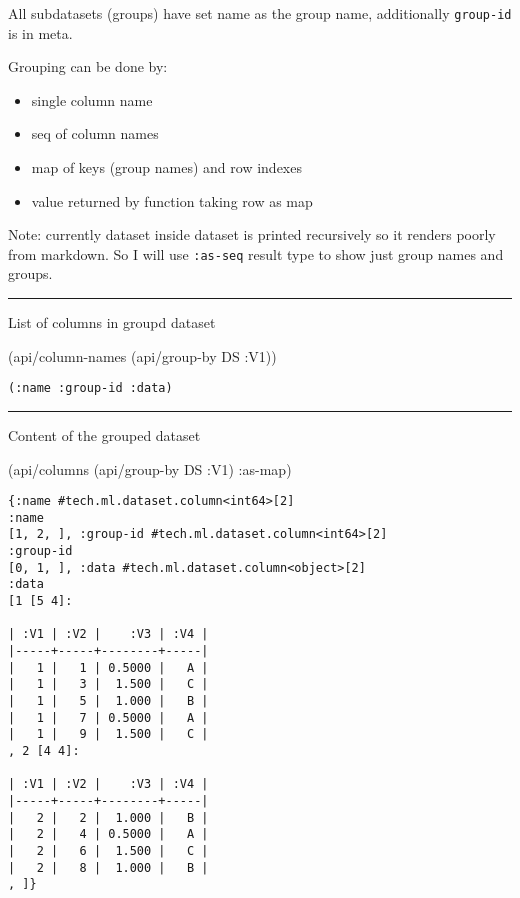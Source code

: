 \documentclass[]{article}
\newenvironment{Shaded}{\begin{snugshade}}{\end{snugshade}}
\newcommand{\AttributeTok}[1]{\textcolor[rgb]{0.77,0.63,0.00}{#1}}
\newcommand{\NormalTok}[1]{#1}
\providecommand{\tightlist}{%
  \setlength{\itemsep}{0pt}\setlength{\parskip}{0pt}}
\begin{document}
All subdatasets (groups) have set name as the group name, additionally
\texttt{group-id} is in meta.

Grouping can be done by:

\begin{itemize}
\tightlist
\item
  single column name
\item
  seq of column names
\item
  map of keys (group names) and row indexes
\item
  value returned by function taking row as map
\end{itemize}

Note: currently dataset inside dataset is printed recursively so it
renders poorly from markdown. So I will use \texttt{:as-seq} result type
to show just group names and groups.

\begin{center}\rule{0.5\linewidth}{0.5pt}\end{center}

List of columns in groupd dataset

\begin{Shaded}
\begin{Highlighting}[]
\NormalTok{(api/column-names (api/group-by DS }\AttributeTok{:V1}\NormalTok{))}
\end{Highlighting}
\end{Shaded}

\begin{verbatim}
(:name :group-id :data)
\end{verbatim}

\begin{center}\rule{0.5\linewidth}{0.5pt}\end{center}

Content of the grouped dataset

\begin{Shaded}
\begin{Highlighting}[]
\NormalTok{(api/columns (api/group-by DS }\AttributeTok{:V1}\NormalTok{) }\AttributeTok{:as-map}\NormalTok{)}
\end{Highlighting}
\end{Shaded}

\begin{verbatim}
{:name #tech.ml.dataset.column<int64>[2]
:name
[1, 2, ], :group-id #tech.ml.dataset.column<int64>[2]
:group-id
[0, 1, ], :data #tech.ml.dataset.column<object>[2]
:data
[1 [5 4]:

| :V1 | :V2 |    :V3 | :V4 |
|-----+-----+--------+-----|
|   1 |   1 | 0.5000 |   A |
|   1 |   3 |  1.500 |   C |
|   1 |   5 |  1.000 |   B |
|   1 |   7 | 0.5000 |   A |
|   1 |   9 |  1.500 |   C |
, 2 [4 4]:

| :V1 | :V2 |    :V3 | :V4 |
|-----+-----+--------+-----|
|   2 |   2 |  1.000 |   B |
|   2 |   4 | 0.5000 |   A |
|   2 |   6 |  1.500 |   C |
|   2 |   8 |  1.000 |   B |
, ]}
\end{verbatim}
\end{document}
